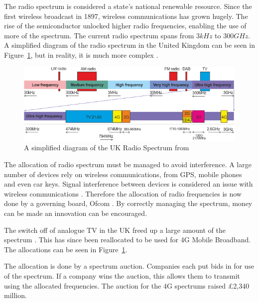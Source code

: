 {}


The radio spectrum is considered a state's national renewable resource.
Since the first wireless broadcast in 1897, wireless communications has grown hugely. %
The rise of the semiconductor unlocked higher radio frequencies, enabling the use of more of the spectrum.
The current radio spectrum spans from $3kHz$ to $300 GHz$. 
A simplified diagram of the radio spectrum in the United Kingdom can be seen in Figure~\ref{c3:ukspectrum}, but in reality, it is much more complex \cite{roke:ukspectrum}.

\begin{figure}
\includegraphics[width=\textwidth]{Figures/radiospectrum.png}
\caption{A simplified diagram of the UK Radio Spectrum from \cite{ukfreetv}}
\label{c3:ukspectrum}
\end{figure}

The allocation of radio spectrum must be managed to avoid interference. 
A large number of devices rely on wireless communications, from GPS, mobile phones and even car keys.
Signal interference between devices is considered an issue with wireless communications \cite{GPS}. 
Therefore the allocation of radio frequencies is now done by a governing board, Ofcom \cite{ofcom:whatis}.
By correctly managing the spectrum, money can be made an innovation can be encouraged.

The switch off of analogue TV in the UK freed up a large amount of the spectrum \cite{ofcom:tv}.
This has since been reallocated to be used for 4G Mobile Broadband.
The allocations can be seen in Figure~\ref{c3:ukspectrum}.

The allocation is done by a spectrum auction.
Companies each put bids in for use of the spectrum. 
If a company wins the auction, this allows them to transmit using the allocated frequencies. 
The auction for the 4G spectrums raised \pounds 2,340 million. 


